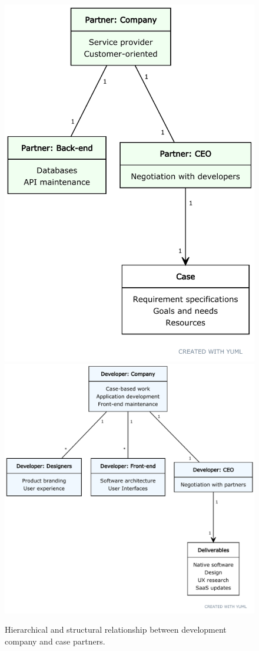 \documentclass[../report.tex]{subfiles}
\begin{document}
\begin{figure}[H]
\centering
\includegraphics[width=0.8\linewidth]{figures/umlpartner.pdf}
\vspace{0.5cm} \\
\includegraphics[width=0.8\linewidth]{figures/umldeveloper.pdf}
\caption{Hierarchical and structural relationship between development company and case partners.}
\label{fig:organisation}
\end{figure}
\end{document}
